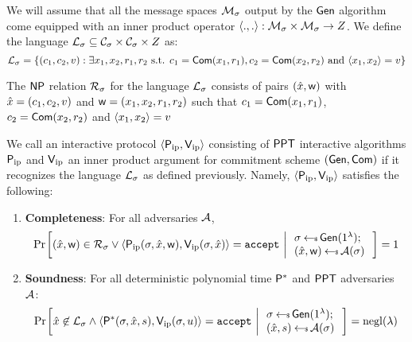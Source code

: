 We will assume that all the message spaces $\mathcal{M}_\sigma$ output by the $\mathsf{Gen}$ algorithm come equipped with an inner product operator $\langle .,.\rangle:\mathcal{M}_\sigma\times \mathcal{M}_\sigma\rightarrow Z$. We define the language $\mathcal{L}_\sigma\subseteq \mathcal{C}_\sigma\times \mathcal{C}_\sigma\times Z$ as:
\begin{equation*}
\mathcal{L}_\sigma = \{(c_1,c_2,v):\exists x_1,x_2,r_1,r_2 \text{ s.t. }
c_1=\mathsf{Com}(x_1,r_1), c_2=\mathsf{Com}(x_2,r_2) \text{ and } \langle x_1,x_2\rangle=v\} 
\end{equation*}

The $\mathsf{NP}$ relation $\mathcal{R}_\sigma$ for the language $\mathcal{L}_\sigma$ consists of pairs $(\hat{x},\mathsf{w})$ with $\hat{x}=(c_1,c_2,v)$ and $\mathsf{w}=(x_1,x_2,r_1,r_2)$ such that $c_1=\mathsf{Com}(x_1,r_1)$, $c_2=\mathsf{Com}(x_2,r_2)$ and $\langle x_1,x_2\rangle=v$ 

\begin{definition}\label{defn:innerproductarg}
We call an interactive protocol $\langle \mathsf{P}_\mathrm{ip},\mathsf{V}_\mathrm{ip}\rangle$ consisting of $\mathsf{PPT}$ interactive algorithms $\mathsf{P}_\mathrm{ip}$ and $\mathsf{V}_\mathrm{ip}$ an inner product argument for commitment scheme $(\mathsf{Gen},\mathsf{Com})$ if it recognizes the language $\mathcal{L}_\sigma$ as defined previously. Namely, $\langle \mathsf{P}_\mathrm{ip},\mathsf{V}_\mathrm{ip}\rangle$ satisfies the following:
\begin{enumerate}[{\rm (i)}]
\item {\bf Completeness}: For all adversaries $\mathcal{A}$,
\begin{align*}
\condprob{(\stmt,\wit)\in \calR_\sigma \vee \langle \pip(\sigma,\stmt,\wit),\vip(\sigma,\stmt)\rangle={\tt accept}}{
\begin{array}{l}
\sigma\sample \gen(\secparam);\\
(\stmt,\wit)\sample \adv(\sigma)
\end{array}
}=1
\end{align*}

\item{\bf Soundness}: For all deterministic polynomial time $\mathsf{P}^*$ and $\mathsf{PPT}$ adversaries $\mathcal{A}$:
\begin{align*}
\condprob{\stmt\not\in \calL_\sigma \wedge \langle
\prover^*(\sigma,\stmt,s),\vip(\sigma,u)\rangle={\tt accept}}{
\begin{array}{l}
\sigma\sample \gen(\secparam);\\
(\stmt,s)\sample \adv(\sigma)
\end{array}
} = \negl(\lambda)
\end{align*}
\end{enumerate}
\end{definition}

